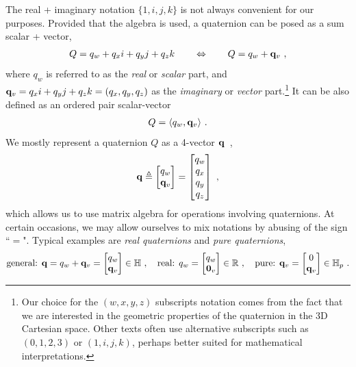 The real + imaginary notation $\{1,i,j,k\}$ is not always convenient for our purposes. 
%
%
Provided that the algebra  is used, a quaternion can be posed as a sum scalar + vector,
%
\begin{align}
Q=q_w+q_xi+q_yj+q_zk
\qquad
\Leftrightarrow
\qquad
Q = q_w + {\bf q}_v~,
\end{align}
%
where $q_w$ is referred to as the \emph{real} or \emph{scalar} part, and ${\bf q}_v=q_x i+q_y j+q_z k=(q_x,q_y,q_z)$ as the \emph{imaginary} or \emph{vector} part.\footnote{\label{ftn:quatComponents}Our choice for the $(w,x,y,z)$ subscripts notation comes from the fact that we are interested in the geometric properties of the quaternion in the 3D Cartesian space. 
Other texts often use alternative subscripts such as $(0,1,2,3)$ or $(1,i,j,k)$, perhaps better suited for mathematical interpretations.} 
%
It can be also defined as an ordered pair scalar-vector 
%
\begin{align}
Q = \langle q_w,{\bf q}_v\rangle ~.
\end{align}
%
We mostly represent a quaternion $Q$ as a 4-vector ${\bf q}$~,
%
\begin{align}
{\bf q} \triangleq 
\begin{bmatrix}
q_w\\{\bf q}_v
\end{bmatrix}=
\begin{bmatrix}
q_w\\q_x\\q_y\\q_z
\end{bmatrix}~,
\end{align}%
%
which allows us to use matrix algebra for operations involving quaternions.
At certain occasions, we may allow ourselves to mix notations by abusing of the sign ``$=$". Typical examples are \emph{real quaternions} and \emph{pure quaternions},
%
\begin{align}
\textrm{general: }
{\bf q}
=q_w+{\bf q}_v=\begin{bmatrix}
q_w\\{\bf q}_v
\end{bmatrix} \in {\mathbb H}
~,\quad
\textrm{real: }
q_w=\begin{bmatrix}
q_w\\{\bf0}_v
\end{bmatrix} \in {\mathbb R}
~,\quad
\textrm{pure: }
{\bf q}_v=\begin{bmatrix}
0\\{\bf q}_v
\end{bmatrix} \in {\mathbb H}_p
~.
\end{align}




